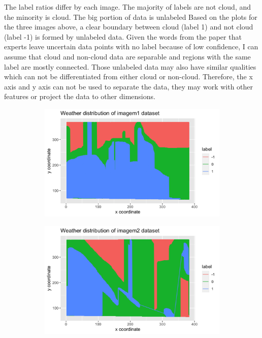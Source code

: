 \documentclass[11pt]{article}
\begin{document}
The label ratios differ by each image. The majority of labels are not cloud, and the minority is cloud. The big portion of data is unlabeled Based on the plots for the three images above, a clear boundary between cloud (label 1) and not cloud (label -1) is formed by unlabeled data. Given the words from the paper that experts leave uncertain data points with no label because of low confidence, I can assume that cloud and non-cloud data are separable and regions with the same label are mostly connected. Those unlabeled data may also have similar qualities which can not be differentiated from either cloud or non-cloud. Therefore, the x axis and y axis can not be used to separate the data, they may work with other features or project the data to other dimensions.
\begin{figure}[H]
  \centering
  \begin{subfigure}{.5\textwidth}
    \centering
      \includegraphics[width=1\textwidth, height=0.6\textwidth]{../figures/figure1.png}    
  \end{subfigure}%
  \begin{subfigure}{.5\textwidth}
    \centering
      \includegraphics[width=1\textwidth, height=0.6\textwidth]{../figures/figure2.png}
  \end{subfigure}%
  

\end{figure}
\end{document}
